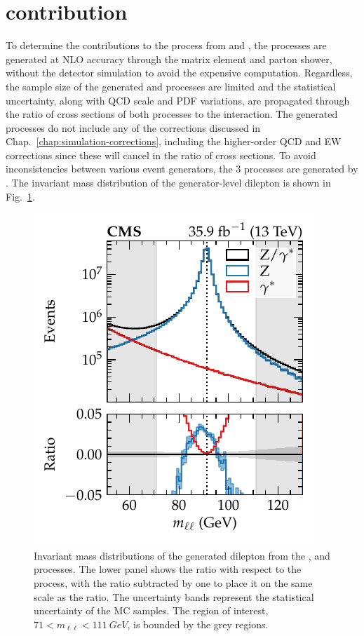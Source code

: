 \section{\Pgstar contribution}

To determine the contributions to the \IDYll process from \IZll and \Igstarll, the processes are generated at NLO accuracy through the matrix element and parton shower, without the detector simulation to avoid the expensive computation. Regardless, the sample size of the generated \IZll and \Igstarll processes are limited and the statistical uncertainty, along with QCD scale and PDF variations, are propagated through the ratio of cross sections of both processes to the \IDYll interaction. The generated processes do not include any of the corrections discussed in Chap.~\ref{chap:simulation-corrections}, including the higher-order QCD and EW corrections since these will cancel in the ratio of cross sections. To avoid inconsistencies between various event generators, the 3 processes are generated by \MADGRAPH. The invariant mass distribution of the generator-level dilepton is shown in Fig.~\ref{fig:gstar_invmass}.
%
\begin{figure}
    \centering
    \includegraphics{chapters/042_backgrounds/images/gstar_invmass.pdf}
    \caption[Invariant mass distributions of the \IDYll, \IZll and \Igstarll processes.]{
        Invariant mass distributions of the generated dilepton from the \IDYll, \IZll and \Igstarll processes. The lower panel shows the ratio with respect to the \IDYll process, with the \IZll ratio subtracted by one to place it on the same scale as the \Igstar ratio. The uncertainty bands represent the statistical uncertainty of the MC samples. The region of interest, ${71<m_{\ell\ell}<\SI{111}{GeV}}$, is bounded by the grey regions.
    }
    \label{fig:gstar_invmass}
\end{figure}
